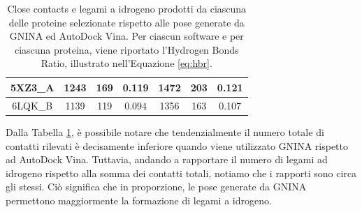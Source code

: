 \begin{table}[H]
{\begin{tabular}{|c|ccc|ccc|}
5XZ3\_A                                                           & \multicolumn{1}{c|}{1243}                                                                                              & \multicolumn{1}{c|}{169}                                                                                                & 0.119                                                                             & \multicolumn{1}{c|}{1472}                                                                                              & \multicolumn{1}{c|}{203}                                                                                                & 0.121                                                                             \\ \hline
6LQK\_B                                                           & \multicolumn{1}{c|}{1139}                                                                                              & \multicolumn{1}{c|}{119}                                                                                                & 0.094                                                                             & \multicolumn{1}{c|}{1356}                                                                                              & \multicolumn{1}{c|}{163}                                                                                                & 0.107                                                                             \\ \hline
\end{tabular}%
}
\caption[Interazioni nel complesso proteina-ligando generato da GNINA e AutoDock Vina.]{Close contacts e legami a idrogeno prodotti da ciascuna delle proteine selezionate rispetto alle pose generate da GNINA ed AutoDock Vina. Per ciascun software e per ciascuna proteina, viene riportato l'Hydrogen Bonds Ratio, illustrato nell'Equazione \ref{eq:hbr}.}
\label{contacts_table}
\end{table}

Dalla Tabella \ref{contacts_table}, è possibile notare che tendenzialmente il numero totale di contatti rilevati è decisamente inferiore quando viene utilizzato GNINA rispetto ad AutoDock Vina. Tuttavia, andando a rapportare il numero di legami ad idrogeno rispetto alla somma dei contatti totali, notiamo che i rapporti sono circa gli stessi. Ciò significa che in proporzione, le pose generate da GNINA permettono maggiormente la formazione di legami a idrogeno. 

